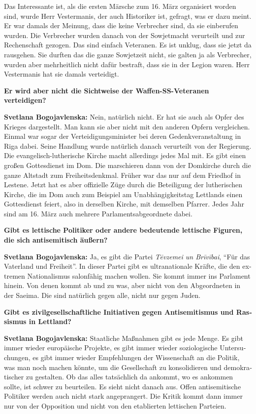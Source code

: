 \begin{otherlanguage}{ngerman}
Das Interessante ist, als die ersten Märsche zum 16. März organisiert worden sind, wurde Herr Vestermanis, der auch Historiker ist, gefragt, was er dazu meint. Er war damals der Meinung, dass die keine Verbrecher sind, da sie einberufen wurden. Die Verbrecher wurden danach von der Sowjetmacht verurteilt und zur Rechenschaft gezogen. Das sind einfach Veteranen. Es ist unklug, dass sie jetzt da rausgehen. Sie durften das die ganze Sowjetzeit nicht, sie galten ja als Verbrecher, wurden aber mehrheitlich nicht dafür bestraft, dass sie in der Legion waren. Herr Vestermanis hat sie damals verteidigt.

\textbf{Er wird aber nicht die Sichtweise der Waffen-SS-Veteranen verteidigen?}

\textbf{Svetlana Bogojavlenska:} Nein, natürlich nicht. Er hat sie auch als Opfer des Krieges dargestellt. Man kann sie aber nicht mit den anderen Opfern vergleichen. Einmal war sogar der Verteidigungsminister bei deren Gedenkveranstaltung in Riga dabei. Seine Handlung wurde natürlich danach verurteilt von der Regierung. Die evangelisch-lutherische Kirche macht allerdings jedes Mal mit. Es gibt einen großen Gottesdienst im Dom. Die marschieren dann von der Domkirche durch die ganze Altstadt zum Freiheitsdenkmal. Früher war das nur auf dem Friedhof in Lestene. Jetzt hat es aber offizielle Züge durch die Beteiligung der lutherischen Kirche, die im Dom auch zum Beispiel am Unabhängigkeitstag Lettlands einen Gottesdienst feiert, also in derselben Kirche, mit demselben Pfarrer. Jedes Jahr sind am 16. März auch mehrere Parlamentsabgeordnete dabei.

\textbf{Gibt es lettische Politiker oder andere bedeutende lettische Figuren, die sich antisemitisch äußern?}

\textbf{Svetlana Bogojavlenska:} Ja, es gibt die Partei \textit{Tēvzemei un Brīvībai}, "`Für das Vaterland und Freiheit"'. In dieser Partei gibt es ultranationale Kräfte, die den extremen Nationalismus salonfähig machen wollen. Sie kommt immer ins Parlament hinein. Von denen kommt ab und zu was, aber nicht von den Abgeordneten in der Saeima. Die sind natürlich gegen alle, nicht nur gegen Juden.

\textbf{Gibt es zivilgesellschaftliche Initiativen gegen Antisemitismus und Rassismus in Lettland?}

\textbf{Svetlana Bogojavlenska:} Staatliche Maßnahmen gibt es jede Menge. Es gibt immer wieder europäische Projekte, es gibt immer wieder soziologische Untersuchungen, es gibt immer wieder Empfehlungen der Wissenschaft an die Politik, was man noch machen könnte, um die Gesellschaft zu konsolidieren und demokratischer zu gestalten. Ob das alles tatsächlich da ankommt, wo es ankommen sollte, ist schwer zu beurteilen. Es sieht nicht danach aus. Offen antisemitische Politiker werden auch nicht stark angeprangert. Die Kritik kommt dann immer nur von der Opposition und nicht von den etablierten lettischen Parteien.


\end{otherlanguage}
